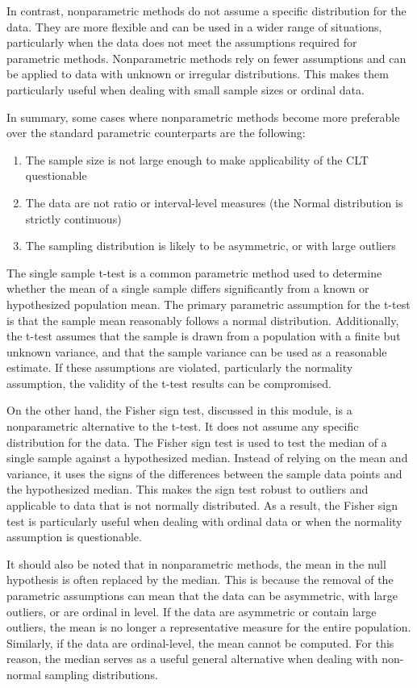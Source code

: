 \documentclass{article}
\begin{document}
In contrast, nonparametric methods do not assume a specific distribution for the data. They are more flexible and can be used in a wider range of situations, particularly when the data does not meet the assumptions required for parametric methods. Nonparametric methods rely on fewer assumptions and can be applied to data with unknown or irregular distributions. This makes them particularly useful when dealing with small sample sizes or ordinal data.

In summary, some cases where nonparametric methods become more preferable over the standard parametric counterparts are the following:

\begin{enumerate}
    \item The sample size is not large enough to make applicability of the CLT questionable
    \item The data are not ratio or interval-level measures (the Normal distribution is strictly continuous)
    \item The sampling distribution is likely to be asymmetric, or with large outliers
\end{enumerate}

The single sample t-test is a common parametric method used to determine whether the mean of a single sample differs significantly from a known or hypothesized population mean. The primary parametric assumption for the t-test is that the sample mean reasonably follows a normal distribution. Additionally, the t-test assumes that the sample is drawn from a population with a finite but unknown variance, and that the sample variance can be used as a reasonable estimate. If these assumptions are violated, particularly the normality assumption, the validity of the t-test results can be compromised.

On the other hand, the Fisher sign test, discussed in this module, is a nonparametric alternative to the t-test. It does not assume any specific distribution for the data. The Fisher sign test is used to test the median of a single sample against a hypothesized median. Instead of relying on the mean and variance, it uses the signs of the differences between the sample data points and the hypothesized median. This makes the sign test robust to outliers and applicable to data that is not normally distributed. As a result, the Fisher sign test is particularly useful when dealing with ordinal data or when the normality assumption is questionable.

It should also be noted that in nonparametric methods, the mean in the null hypothesis is often replaced by the median. This is because the removal of the parametric assumptions can mean that the data can be asymmetric, with large outliers, or are ordinal in level. If the data are asymmetric or contain large outliers, the mean is no longer a representative measure for the entire population. Similarly, if the data are ordinal-level, the mean cannot be computed. For this reason, the median serves as a useful general alternative when dealing with non-normal sampling distributions.
\end{document}
